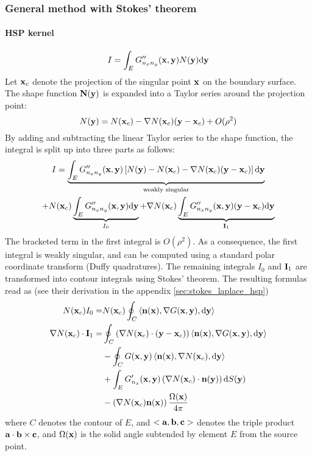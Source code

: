 \subsubsection{General method with Stokes' theorem}

\paragraph{HSP kernel}

\begin{equation}
	I = \int_E G''_{n_x n_y}({\bf x}, {\bf y}) N({\bf y}) \mathrm{d} {\bf y}
\end{equation}
%
Let ${\bf x}_c$ denote the projection of the singular point ${\bf x}$ on the boundary surface.
The shape function ${\bf N}({\bf y})$ is expanded into a Taylor series around the projection point:
%
\begin{equation}
	N({\bf y}) = N({\bf x}_c) - \nabla N({\bf x}_c) ({\bf y} - {\bf x}_c) + O(\rho^2)
\end{equation}
%
By adding and subtracting the linear Taylor series to the shape function, the integral is split up into three parts as follows:
%
\begin{multline}
	I = \underbrace{\int_E G''_{n_x n_y}({\bf x}, {\bf y})
	\left[ N({\bf y}) - N({\bf x}_c) - \nabla N({\bf x}_c) ({\bf y} - {\bf x}_c)\right]
	\mathrm{d} {\bf y}}_{\text{weakly singular}} \\
	+
	N({\bf x}_c)
	\underbrace{\int_E G''_{n_x n_y}({\bf x}, {\bf y})
	\mathrm{d} {\bf y}}_{I_0}
	+
	\nabla N({\bf x}_c)
	\underbrace{\int_E G''_{n_x n_y}({\bf x}, {\bf y})
	({\bf y} - {\bf x}_c)
	\mathrm{d} {\bf y}}_{{\bf I}_1}
\end{multline}
%
The bracketed term in the first integral is $O(\rho^2)$.
As a consequence, the first integral is weakly singular, and can be computed using a standard polar coordinate transform (Duffy quadratures).
The remaining integrals $I_0$ and ${\bf I}_1$ are transformed into contour integrals using Stokes' theorem.
The resulting formulas read as (see their derivation in the appendix \ref{sec:stokes_laplace_hsp})
%
\begin{align}
	N({\bf x}_c) I_0 =
	&
	N({\bf x}_c) \oint_C
	\left< {\bf n}({\bf x}), \nabla G({\bf x}, {\bf y}) , \mathrm{d} {\bf y} \right> \\
	{\nabla N}({\bf x}_c) \cdot {\bf I}_{1} =
	& 
	\oint_C
	\left( \nabla N({\bf x}_c) \cdot ({\bf y} - {\bf x}_c) \right)
	\left< {\bf n}({\bf x}) , \nabla G({\bf x}, {\bf y}) , \mathrm{d} {\bf y} \right> \\
	&
	-
	\oint_C
	G({\bf x}, {\bf y})
	\left< {\bf n}({\bf x}), \nabla N({\bf x}_c), \mathrm{d} {\bf y} \right>
	\\
	&
	+
	\int_E
	G'_{n_x}({\bf x}, {\bf y})
	\left(\nabla N({\bf x}_c) \cdot {\bf n}({\bf y})\right)
	\mathrm{d} S({\bf y}) \\
	&
	-
	\left( \nabla N({\bf x}_c) {\bf n}({\bf x}) \right)
	\frac{\Omega({\bf x})}{4\pi}
\end{align}
%
where $C$ denotes the contour of $E$, and $<{\bf a}, {\bf b}, {\bf c}>$ denotes the triple product ${\bf a} \cdot {\bf b} \times {\bf c}$, and $\Omega({\bf x})$ is the solid angle subtended by element $E$ from the source point.
